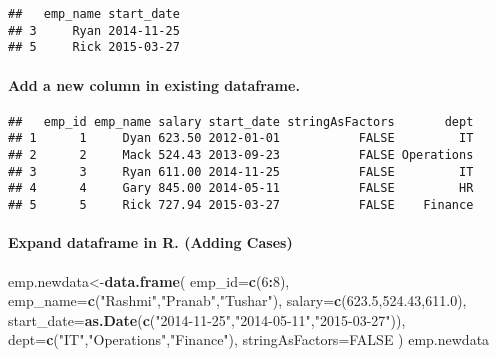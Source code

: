 \documentclass[
]{article}
\newenvironment{Shaded}{\begin{snugshade}}{\end{snugshade}}
\newcommand{\AttributeTok}[1]{\textcolor[rgb]{0.13,0.29,0.53}{#1}}
\newcommand{\CommentTok}[1]{\textcolor[rgb]{0.56,0.35,0.01}{\textit{#1}}}
\newcommand{\ConstantTok}[1]{\textcolor[rgb]{0.56,0.35,0.01}{#1}}
\newcommand{\DecValTok}[1]{\textcolor[rgb]{0.00,0.00,0.81}{#1}}
\newcommand{\FloatTok}[1]{\textcolor[rgb]{0.00,0.00,0.81}{#1}}
\newcommand{\FunctionTok}[1]{\textcolor[rgb]{0.13,0.29,0.53}{\textbf{#1}}}
\newcommand{\NormalTok}[1]{#1}
\newcommand{\OtherTok}[1]{\textcolor[rgb]{0.56,0.35,0.01}{#1}}
\newcommand{\SpecialCharTok}[1]{\textcolor[rgb]{0.81,0.36,0.00}{\textbf{#1}}}
\newcommand{\StringTok}[1]{\textcolor[rgb]{0.31,0.60,0.02}{#1}}
\begin{document}
\begin{verbatim}
##   emp_name start_date
## 3     Ryan 2014-11-25
## 5     Rick 2015-03-27
\end{verbatim}

\paragraph{Add a new column in existing
dataframe.}\label{add-a-new-column-in-existing-dataframe.}

\begin{Shaded}
\end{Shaded}

\begin{verbatim}
##   emp_id emp_name salary start_date stringAsFactors       dept
## 1      1     Dyan 623.50 2012-01-01           FALSE         IT
## 2      2     Mack 524.43 2013-09-23           FALSE Operations
## 3      3     Ryan 611.00 2014-11-25           FALSE         IT
## 4      4     Gary 845.00 2014-05-11           FALSE         HR
## 5      5     Rick 727.94 2015-03-27           FALSE    Finance
\end{verbatim}

\paragraph{Expand dataframe in R. (Adding
Cases)}\label{expand-dataframe-in-r.-adding-cases}

\begin{Shaded}
\begin{Highlighting}[]
\NormalTok{emp.newdata}\OtherTok{\textless{}{-}}\FunctionTok{data.frame}\NormalTok{(}
\AttributeTok{emp\_id=}\FunctionTok{c}\NormalTok{(}\DecValTok{6}\SpecialCharTok{:}\DecValTok{8}\NormalTok{),}
\AttributeTok{emp\_name=}\FunctionTok{c}\NormalTok{(}\StringTok{"Rashmi"}\NormalTok{,}\StringTok{"Pranab"}\NormalTok{,}\StringTok{"Tushar"}\NormalTok{),}
\AttributeTok{salary=}\FunctionTok{c}\NormalTok{(}\FloatTok{623.5}\NormalTok{,}\FloatTok{524.43}\NormalTok{,}\FloatTok{611.0}\NormalTok{),}
\AttributeTok{start\_date=}\FunctionTok{as.Date}\NormalTok{(}\FunctionTok{c}\NormalTok{(}\StringTok{"2014{-}11{-}25"}\NormalTok{,}\StringTok{"2014{-}05{-}11"}\NormalTok{,}\StringTok{"2015{-}03{-}27"}\NormalTok{)),}
\AttributeTok{dept=}\FunctionTok{c}\NormalTok{(}\StringTok{"IT"}\NormalTok{,}\StringTok{"Operations"}\NormalTok{,}\StringTok{"Finance"}\NormalTok{),}
\AttributeTok{stringAsFactors=}\ConstantTok{FALSE}
\NormalTok{)}
\NormalTok{emp.newdata}
\end{Highlighting}
\end{Shaded}
\end{document}
